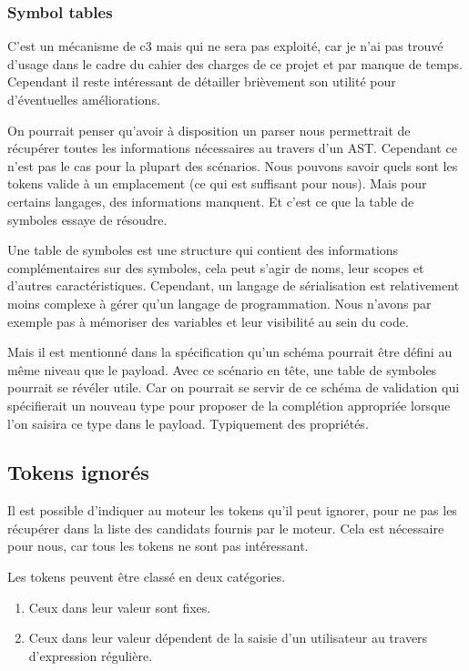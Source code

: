 \documentclass[
    iict, %
    il, %
]{heig-tb}
\begin{document}
\subsubsection{Symbol tables}\label{Symbol tables}

C'est un mécanisme de c3 mais qui ne sera pas exploité, car je n'ai pas trouvé d'usage dans le cadre du cahier des charges de ce projet et par manque de temps.
Cependant il reste intéressant de détailler brièvement son utilité pour d'éventuelles améliorations.

On pourrait penser qu'avoir à disposition un parser nous permettrait de récupérer toutes les informations nécessaires au travers d'un AST.
Cependant ce n'est pas le cas pour la plupart des scénarios.
Nous pouvons savoir quels sont les tokens valide à un emplacement (ce qui est suffisant pour nous). Mais pour certains langages, des informations manquent.
Et c'est ce que la table de symboles essaye de résoudre.

Une table de symboles est une structure qui contient des informations complémentaires sur des symboles, cela peut s'agir de noms, leur scopes et d'autres caractéristiques.
Cependant, un langage de sérialisation est relativement moins complexe à gérer qu'un langage de programmation.
Nous n'avons par exemple pas à mémoriser des variables et leur visibilité au sein du code.

Mais il est mentionné dans la spécification qu'un schéma pourrait être défini au même niveau que le payload.
Avec ce scénario en tête, une table de symboles pourrait se révéler utile. Car on pourrait se servir de ce schéma de validation qui spécifierait un nouveau type pour proposer de la complétion appropriée
lorsque l'on saisira ce type dans le payload. Typiquement des propriétés.

\subsection{Tokens ignorés}

Il est possible d'indiquer au moteur les tokens qu'il peut ignorer, pour ne pas les récupérer dans la liste des candidats fournis par le moteur.
Cela est nécessaire pour nous, car tous les tokens ne sont pas intéressant.

Les tokens peuvent être classé en deux catégories.

\begin{enumerate}
    \item Ceux dans leur valeur sont fixes.
    \item Ceux dans leur valeur dépendent de la saisie d'un utilisateur au travers d'expression régulière.
\end{enumerate}
\end{document}
